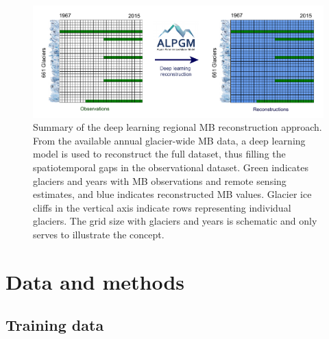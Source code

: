 \begin{figure}[t]
\centering
\includegraphics[width=15cm]{Figures/past/Figure_1.pdf}
\captionsetup{justification=centering}
\caption{Summary of the deep learning regional MB reconstruction approach. From the available annual glacier-wide MB data, a deep learning model is used to reconstruct the full dataset, thus filling the spatiotemporal gaps in the observational dataset. Green indicates glaciers and years with MB observations and remote sensing estimates, and blue indicates reconstructed MB values. Glacier ice cliffs in the vertical axis indicate rows representing individual glaciers. The grid size with glaciers and years is schematic and only serves to illustrate the concept.}
\label{past:fig1}
\end{figure}


\section{Data and methods} \label{past:methods}

\subsection{Training data} \label{past:methods:data}

